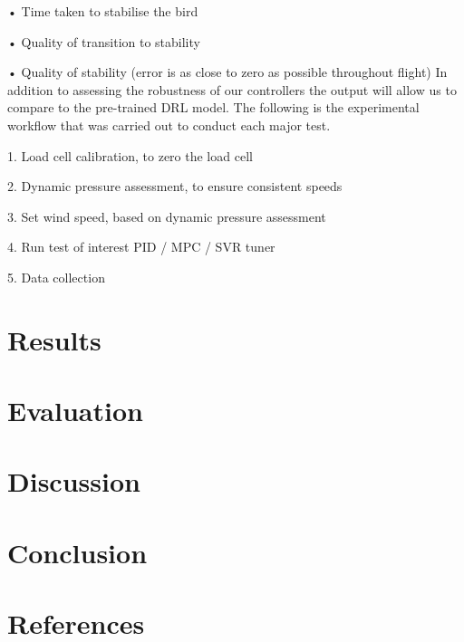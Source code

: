         • Time taken to stabilise the bird

        • Quality of transition to stability

        • Quality of stability (error is as close to zero as possible throughout flight)
    In addition to assessing the robustness of our controllers the output will
    allow us to compare to the pre-trained DRL model.
    The following is the experimental workflow that was carried out to conduct each major test.

        1. Load cell calibration, to zero the load cell

        2. Dynamic pressure assessment, to ensure consistent speeds

        3. Set wind speed, based on dynamic pressure assessment

        4. Run test of interest PID / MPC / SVR tuner

        5. Data collection



\section{Results}
\section{Evaluation}
\section{Discussion}
\section{Conclusion}
\section{References}
